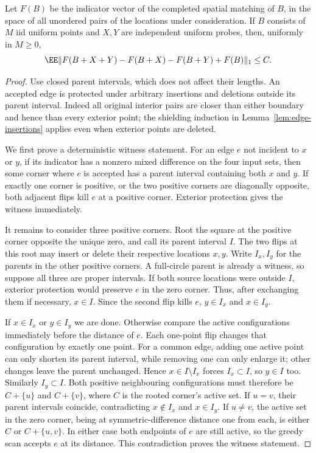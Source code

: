 \documentclass[11pt,letterpaper]{article}
\begin{document}
\begin{lemma}
\label{lem:matching-rectangle}
Let $F(B)$ be the indicator vector of the completed spatial matching
of $B$, in the space of all unordered pairs of the locations under
consideration. If $B$ consists of $M$ iid uniform points and $X,Y$
are independent uniform probes, then, uniformly in $M\ge0$,
\begin{equation}\label{eq:matching-rectangle}
 \EE\|F(B+X+Y)-F(B+X)-F(B+Y)+F(B)\|_1\le C.
\end{equation}
\end{lemma}
\begin{proof}
Use closed parent intervals, which does not affect their lengths.
An accepted edge is protected under arbitrary insertions and deletions
outside its parent interval. Indeed all original interior pairs are
closer than either boundary and hence than every exterior point;
the shielding induction in Lemma~\ref{lem:edge-insertions} applies
even when exterior points are deleted.

We first prove a deterministic witness statement. For an edge $e$
not incident to $x$ or $y$, if its indicator has a nonzero mixed
difference on the four input sets, then some corner where $e$ is
accepted has a parent interval containing both $x$ and $y$.
If exactly one corner is positive, or the two positive corners are
diagonally opposite, both adjacent flips kill $e$ at a positive
corner. Exterior protection gives the witness immediately.

It remains to consider three positive corners. Root the square at
the positive corner opposite the unique zero, and call its parent
interval $I$. The two flips at this root may insert or delete their
respective locations $x,y$. Write $I_x,I_y$ for the parents in the
other positive corners. A full-circle parent is already a witness,
so suppose all three are proper intervals. If both source locations
were outside $I$, exterior protection would preserve $e$ in the
zero corner. Thus, after exchanging them if necessary, $x\in I$.
Since the second flip kills $e$, $y\in I_x$ and $x\in I_y$.

If $x\in I_x$ or $y\in I_y$ we are done. Otherwise compare the
active configurations immediately before the distance of $e$.
Each one-point flip changes that configuration by exactly one point.
For a common edge, adding one active point can only shorten its
parent interval, while removing one can only enlarge it; other
changes leave the parent unchanged. Hence $x\in I\setminus I_x$
forces $I_x\subset I$, so $y\in I$ too. Similarly $I_y\subset I$.
Both positive neighbouring configurations must therefore be
$C+\{u\}$ and $C+\{v\}$, where $C$ is the rooted corner's active set.
If $u=v$, their parent intervals coincide, contradicting
$x\notin I_x$ and $x\in I_y$. If $u\ne v$, the active set in the
zero corner, being at symmetric-difference distance one from each,
is either $C$ or $C+\{u,v\}$. In either case both endpoints of $e$
are still active, so the greedy scan accepts $e$ at its distance.
This contradiction proves the witness statement.


\end{proof}
\end{document}
